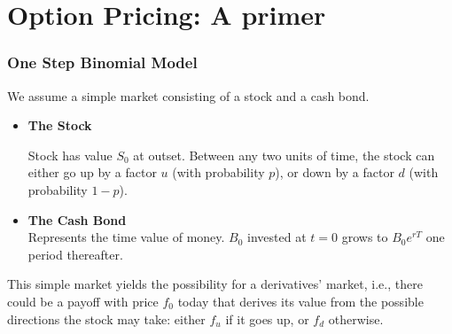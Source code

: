 \documentclass{beamer}
\begin{document}
\section{Option Pricing: A primer}
\begin{frame}
\frametitle{One Step Binomial Model}
We assume a simple market consisting of a stock and a cash bond.
\begin{itemize}
	\item<1->{\textbf{The Stock}\\
	\begin{figure}[h!]
\centering
{}
\end{figure}
Stock has value $S_0$ at outset. Between any two units of time, the stock can either go up by a factor $u$ (with probability $p$), or down by a factor $d$ (with probability $1-p$).
}
	\item<2>{\textbf{The Cash Bond}\\
	Represents the time value of money. $B_0$ invested at $t=0$ grows to $B_0e^{rT}$ one period thereafter.
	}
\end{itemize}
\end{frame}

\begin{frame}
	This simple market yields the possibility for a derivatives' market, i.e., there could be a payoff with price $f_0$ today that derives its value from the possible directions the stock may take: either $f_u$ if it goes up, or $f_d$ otherwise.
\begin{figure}
	
\end{figure}
\end{frame}
\end{document}
